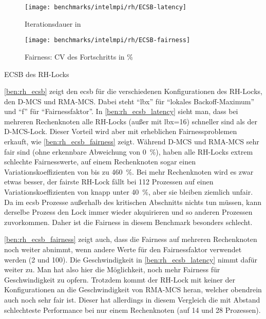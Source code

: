 \begin{benchmark}[h]
    \begin{subfigure}{.5\textwidth}
        \texttt{[image: benchmarks/intelmpi/rh/ECSB-latency]}
        \caption{Iterationsdauer in }
        \label{ben:rh_ecsb_latency}
    \end{subfigure}
    \begin{subfigure}{.5\textwidth}
        \texttt{[image: benchmarks/intelmpi/rh/ECSB-fairness]}
        \caption{Fairness: CV des Fortschritts in \%}
        \label{ben:rh_ecsb_fairness}
    \end{subfigure}
    \caption{ECSB des RH-Locks}
    \label{ben:rh_ecsb}
\end{benchmark}

\autoref{ben:rh_ecsb} zeigt den \gls{ecsb} für die verschiedenen Konfigurationen des RH-Locks,
den D-MCS und RMA-MCS.
Dabei steht \enquote{lbx} für \enquote{lokales Backoff-Maximum} und \enquote{f} für \enquote{Fairnessfaktor}.
In \autoref{ben:rh_ecsb_latency} sieht man,
dass bei mehreren Rechenknoten alle RH-Locks (außer mit lbx=16) schneller sind
als der D-MCS-Lock.
Dieser Vorteil wird aber mit erheblichen Fairnessproblemen erkauft,
wie \autoref{ben:rh_ecsb_fairness} zeigt.
Während D-MCS und RMA-MCS sehr fair sind (ohne erkennbare Abweichung von 0~\%),
haben alle RH-Locks extrem schlechte Fairnesswerte,
auf einem Rechenknoten sogar einen Variationskoeffizienten von bis zu 460~\%.
Bei mehr Rechenknoten wird es zwar etwas besser,
der fairste RH-Lock fällt bei 112 Prozessen auf einen Variationskoeffizienten von knapp unter 40~\%,
aber sie bleiben ziemlich unfair.
Da im \gls{ecsb} Prozesse außerhalb des kritischen Abschnitts nichts tun müssen,
kann derselbe Prozess den Lock immer wieder akquirieren
und so anderen Prozessen zuvorkommen.
Daher ist die Fairness in diesem Benchmark besonders schlecht.

\autoref{ben:rh_ecsb_fairness} zeigt auch,
dass die Fairness auf mehreren Rechenknoten noch weiter abnimmt,
wenn andere Werte für den Fairnessfaktor verwendet werden (2 und 100).
Die Geschwindigkeit in \autoref{ben:rh_ecsb_latency} nimmt dafür weiter zu.
Man hat also hier die Möglichkeit,
noch mehr Fairness für Geschwindigkeit zu opfern.
Trotzdem kommt der RH-Lock mit keiner der Konfigurationen an die Geschwindigkeit von RMA-MCS heran,
welcher obendrein auch noch sehr fair ist.
Dieser hat allerdings in diesem Vergleich
die mit Abstand schlechteste Performance
bei nur einem Rechenknoten (auf 14 und 28 Prozessen).

